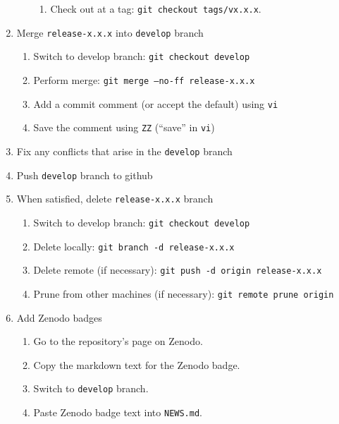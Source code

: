 \documentclass{article}
\begin{document}
\begin{enumerate}
\begin{enumerate}
\begin{enumerate}
	  \item Check out at a tag: \texttt{git checkout tags/vx.x.x}.

	\end{enumerate}
  \end{enumerate}
  \item Merge \texttt{release-x.x.x} into \texttt{develop} branch
  \begin{enumerate}

	\item Switch to develop branch: \texttt{git checkout develop}

    \item Perform merge: \texttt{git merge --no-ff release-x.x.x}

	\item Add a commit comment (or accept the default) using \texttt{vi}

	\item Save the comment using \texttt{ZZ} (``save'' in \texttt{vi})

  \end{enumerate}
  \item Fix any conflicts that arise in the \texttt{develop} branch

  \item Push \texttt{develop} branch to github

  \item When satisfied, delete \texttt{release-x.x.x} branch
  \begin{enumerate}

    \item Switch to develop branch: \texttt{git checkout develop}

    \item Delete locally: \texttt{git branch -d release-x.x.x}

    \item Delete remote (if necessary): \texttt{git push -d origin release-x.x.x}

	\item Prune from other machines (if necessary): \texttt{git remote prune origin}

  \end{enumerate}

  \item Add Zenodo badges
  \begin{enumerate}

    \item Go to the repository's page on Zenodo.

    \item Copy the markdown text for the Zenodo badge.

	\item Switch to \texttt{develop} branch.

	\item Paste Zenodo badge text into \texttt{NEWS.md}.

  \end{enumerate}

\end{enumerate}
\end{document}
